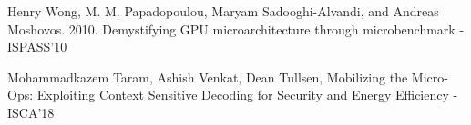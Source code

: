 \documentclass[10pt]{beamer}
\begin{document}
\begin{frame}[allowframebreaks]
\begin{thebibliography}{10}
            Henry Wong, M. M. Papadopoulou, Maryam Sadooghi-Alvandi, and Andreas Moshovos. 2010. Demystifying GPU microarchitecture through microbenchmark - ISPASS'10

        Mohammadkazem Taram, Ashish Venkat, Dean Tullsen, Mobilizing the Micro-Ops: Exploiting Context Sensitive Decoding for Security and Energy Efficiency - ISCA'18
    \end{thebibliography}
\end{frame}

\end{document}
